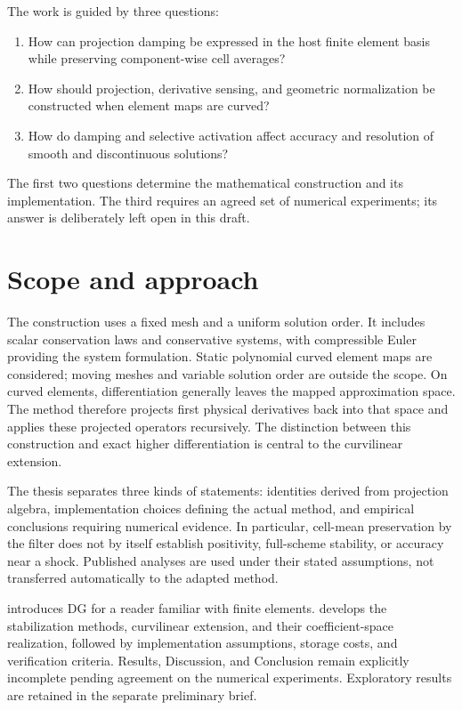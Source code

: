 The work is guided by three questions:
\begin{enumerate}
\item How can projection damping be expressed in the host finite element basis
while preserving component-wise cell averages?
\item How should projection, derivative sensing, and geometric normalization
be constructed when element maps are curved?
\item How do damping and selective activation affect accuracy and resolution
of smooth and discontinuous solutions?
\end{enumerate}
The first two questions determine the mathematical construction and its
implementation. The third requires an agreed set of numerical experiments;
its answer is deliberately left open in this draft.

\section{Scope and approach}
The construction uses a fixed mesh and a uniform solution order. It includes
scalar conservation laws and conservative systems, with compressible Euler
providing the system formulation. Static polynomial curved element maps are
considered; moving meshes and variable solution order are outside the scope.
On curved elements, differentiation generally leaves the mapped approximation
space. The method therefore projects first physical derivatives back into that
space and applies these projected operators recursively. The distinction
between this construction and exact higher differentiation is central to the
curvilinear extension.

The thesis separates three kinds of statements: identities derived from
projection algebra, implementation choices defining the actual method, and
empirical conclusions requiring numerical evidence. In particular, cell-mean
preservation by the filter does not by itself establish positivity, full-scheme
stability, or accuracy near a shock. Published analyses are used under their
stated assumptions, not transferred automatically to the adapted method.

 introduces DG for a reader familiar with finite elements.
 develops the stabilization methods, curvilinear extension,
and their coefficient-space realization, followed by implementation
assumptions, storage costs, and verification criteria. Results, Discussion, and Conclusion remain explicitly
incomplete pending agreement on the numerical experiments. Exploratory results
are retained in the separate preliminary brief.
